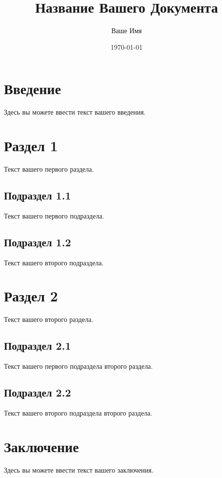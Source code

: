 \documentclass{article}
\begin{document}
\title{Название Вашего Документа}
\author{Ваше Имя}
\date{\today}

\maketitle

\section{Введение}
Здесь вы можете ввести текст вашего введения.

\section{Раздел 1}
Текст вашего первого раздела.

\subsection{Подраздел 1.1}
Текст вашего первого подраздела.

\subsection{Подраздел 1.2}
Текст вашего второго подраздела.

\section{Раздел 2}
Текст вашего второго раздела.

\subsection{Подраздел 2.1}
Текст вашего первого подраздела второго раздела.

\subsection{Подраздел 2.2}
Текст вашего второго подраздела второго раздела.

\section{Заключение}
Здесь вы можете ввести текст вашего заключения.
\end{document}

